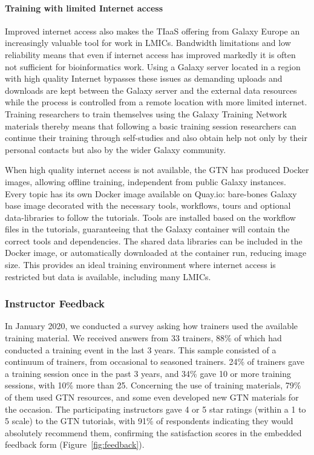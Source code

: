 \documentclass[10pt,letterpaper]{article}
\begin{document}
\paragraph*{Training with limited Internet access}
Improved internet access also makes the TIaaS offering from Galaxy Europe an increasingly valuable tool for work in LMICs.
Bandwidth limitations and low reliability means that even if internet access has improved markedly it is often not sufficient for bioinformatics work.
Using a Galaxy server located in a region with high quality Internet bypasses these issues as demanding uploads and downloads are kept between the Galaxy server and the external data resources while the process is controlled from a remote location with more limited internet. %
Training researchers to train themselves using the Galaxy Training Network materials thereby means that following a basic training session researchers can continue their training through self-studies and also obtain help not only by their personal contacts but also by the wider Galaxy community.

When high quality internet access is not available, the GTN has produced Docker images, allowing offline training, independent from public Galaxy instances.
Every topic has its own Docker image available on Quay.io:  bare-bones Galaxy base image decorated with the necessary tools, workflows, tours and optional data-libraries to follow the tutorials.
Tools are installed based on the workflow files in the tutorials, guaranteeing that the Galaxy container will contain the correct tools and dependencies.
The shared data libraries can be included in the Docker image, or automatically downloaded at the container run, reducing image size.
This provides an ideal training environment where internet access is restricted but data is available, including many LMICs.

\subsubsection*{Instructor Feedback}

In January 2020, we conducted a survey asking how trainers used the available training material. We received answers from 33 trainers, 88\% of which had conducted a training event in the last 3 years.
This sample consisted of a continuum of trainers, from occasional to seasoned trainers. 24\% of trainers gave a training session once in the past 3 years, and 34\% gave 10 or more training sessions, with 10\% more than 25.
Concerning the use of training materials, 79\% of them used GTN resources, and some even developed new GTN materials for the occasion. 
The participating instructors gave 4 or 5 star ratings (within a 1 to 5 scale) to the GTN tutorials, with 91\% of respondents indicating they would absolutely recommend them, confirming the satisfaction scores in the embedded feedback form (Figure~\ref{fig:feedback}).
\end{document}
